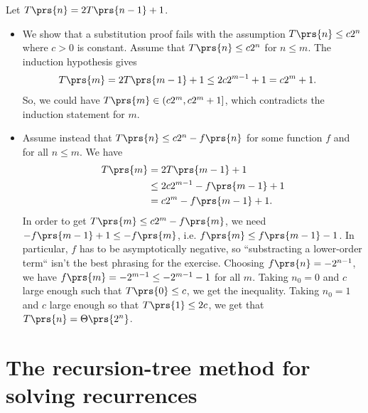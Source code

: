 \documentclass[oneside]{scrbook}
\theoremstyle{definition}
\begin{document}
\begin{exercise}
    Let $T\prs{n} = 2T\prs{n-1} + 1$.
    \begin{itemize}
        \item We show that a substitution proof fails with the assumption $T\prs{n} \leq c 2^n$ where $c > 0$ is constant.
        Assume that $T\prs{n} \leq c 2^n$ for $n \leq m$. The induction hypothesis gives
        \begin{align*}
            T\prs{m} &= 2 T\prs{m-1} + 1 \leq 2 c 2^{m-1} + 1 = c 2^m + 1 \text{.}
        \end{align*}
        So, we could have $T\prs{m} \in \left( c 2^m, c 2^m + 1 \right]$, which contradicts the induction statement for $m$.

        \item Assume instead that $T\prs{n} \leq c 2^n - f\prs{n}$ for some function $f$ and for all $n \leq m$.
        We have
        \begin{align*}
            T\prs{m} &= 2 T\prs{m-1} + 1
            \\&\leq 2 c 2^{m-1} - f\prs{m-1} + 1
            \\&= c 2^m - f\prs{m-1} + 1 \text{.}
        \end{align*}
        In order to get $T\prs{m} \leq c 2^m - f\prs{m}$, we need $- f\prs{m-1} + 1 \leq - f\prs{m}$, i.e. $f\prs{m} \leq f\prs{m-1} - 1$. In particular, $f$ has to be asymptotically negative, so ``substracting a lower-order term`` isn't the best phrasing for the exercise. Choosing $f\prs{n} = - 2^{n-1}$, we have $f\prs{m} = -2^{m-1} \leq -2^{m-1} - 1$ for all $m$. Taking $n_0 = 0$ and $c$ large enough such that $T\prs{0} \leq c$, we get the inequality. Taking $n_0 = 1$ and $c$ large enough so that $T\prs{1} \leq 2c$, we get that $T\prs{n} = \Theta\prs{2^n}$.
    \end{itemize}
\end{exercise}

\section{The recursion-tree method for solving recurrences}
\end{document}
